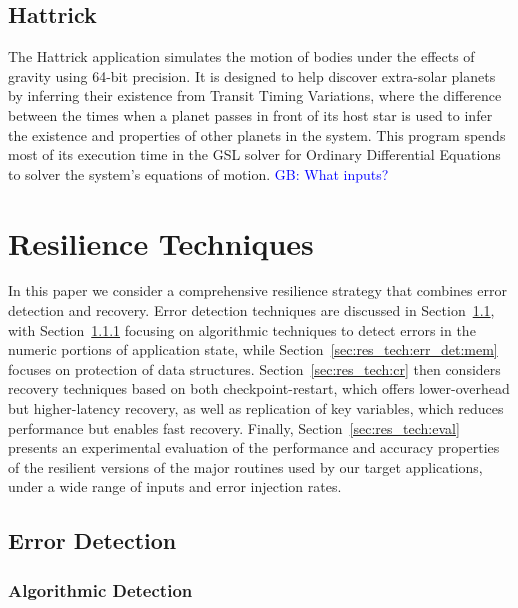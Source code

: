 \documentclass{sig-alternate}
\newcommand{\sui}[1]{%
  \textcolor{green}{SC - #1}
}
\newcommand{\greg}[1]{%
  \textcolor{blue}{GB: #1}
}
\begin{document}
\subsection{Hattrick}
\label{sec:apps:hattrick}
The Hattrick application simulates the motion of bodies under the effects of gravity using 64-bit precision.
It is designed to help discover extra-solar planets by inferring their existence from Transit Timing Variations, where the difference between the times when a planet passes in front of its host star is used to infer the existence and properties of other planets in the system.
This program spends most of its execution time in the GSL solver for Ordinary Differential Equations to solver the system's equations of motion.
\greg{What inputs?}

\section{Resilience Techniques}
\label{sec:res_tech}

In this paper we consider a comprehensive resilience strategy that combines error detection and recovery.
Error detection techniques are discussed in Section~\ref{sec:res_tech:err_det}, with Section~\ref{sec:res_tech:err_det:algo} focusing on algorithmic techniques to detect errors in the numeric portions of application state, while Section~\ref{sec:res_tech:err_det:mem} focuses on protection of data structures.
Section~\ref{sec:res_tech:cr} then considers recovery techniques based on both checkpoint-restart, which offers lower-overhead but higher-latency recovery, as well as replication of key variables, which reduces performance but enables fast recovery.
Finally, Section~\ref{sec:res_tech:eval} presents an experimental evaluation of the performance and accuracy properties of the resilient versions of the major routines used by our target applications, under a wide range of inputs and error injection rates.

\subsection{Error Detection}
\label{sec:res_tech:err_det}

\subsubsection{Algorithmic Detection}
\label{sec:res_tech:err_det:algo}

\end{document}
